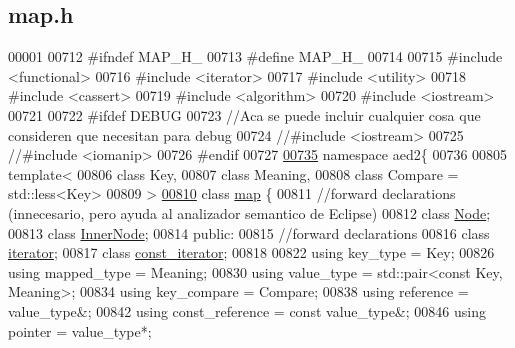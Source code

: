 \hypertarget{map_8h_source}{\subsection{map.\-h}
}

\begin{DoxyCode}
00001 
00712 \textcolor{preprocessor}{#ifndef MAP\_H\_}
00713 \textcolor{preprocessor}{}\textcolor{preprocessor}{#define MAP\_H\_}
00714 \textcolor{preprocessor}{}
00715 \textcolor{preprocessor}{#include <functional>}
00716 \textcolor{preprocessor}{#include <iterator>}
00717 \textcolor{preprocessor}{#include <utility>}
00718 \textcolor{preprocessor}{#include <cassert>}
00719 \textcolor{preprocessor}{#include <algorithm>}
00720 \textcolor{preprocessor}{#include <iostream>}
00721 
00722 \textcolor{preprocessor}{#ifdef DEBUG}
00723 \textcolor{preprocessor}{}\textcolor{comment}{//Aca se puede incluir cualquier cosa que consideren que necesitan para debug}
00724 \textcolor{comment}{//#include <iostream>}
00725 \textcolor{comment}{//#include <iomanip>}
00726 \textcolor{preprocessor}{#endif}
00727 \textcolor{preprocessor}{}
\hypertarget{map_8h_source_l00735}{}\hyperlink{namespaceaed2}{00735} \textcolor{keyword}{namespace }aed2\{
00736 
00805 \textcolor{keyword}{template}<
00806   \textcolor{keyword}{class }Key,
00807   \textcolor{keyword}{class }Meaning,
00808   \textcolor{keyword}{class }Compare = std::less<Key>
00809 >
\hypertarget{map_8h_source_l00810}{}\hyperlink{classaed2_1_1map}{00810} \textcolor{keyword}{class }\hyperlink{classaed2_1_1map}{map} \{
00811     \textcolor{comment}{//forward declarations (innecesario, pero ayuda al analizador semantico de
       Eclipse)}
00812     \textcolor{keyword}{class }\hyperlink{structaed2_1_1map_1_1Node}{Node};
00813     \textcolor{keyword}{class }\hyperlink{structaed2_1_1map_1_1InnerNode}{InnerNode};
00814 \textcolor{keyword}{public}:
00815     \textcolor{comment}{//forward declarations}
00816     \textcolor{keyword}{class }\hyperlink{classaed2_1_1map_1_1iterator}{iterator};
00817     \textcolor{keyword}{class }\hyperlink{classaed2_1_1map_1_1const__iterator}{const_iterator};
00818 
00822     \textcolor{keyword}{using} key\_type = Key;
00826     \textcolor{keyword}{using} mapped\_type = Meaning;
00830     \textcolor{keyword}{using} value\_type = std::pair<const Key, Meaning>;
00834     \textcolor{keyword}{using} key\_compare = Compare;
00838     \textcolor{keyword}{using} reference = value\_type&;
00842     \textcolor{keyword}{using} const\_reference = \textcolor{keyword}{const} value\_type&;
00846     \textcolor{keyword}{using} pointer = value\_type*;

\end{DoxyCode}
